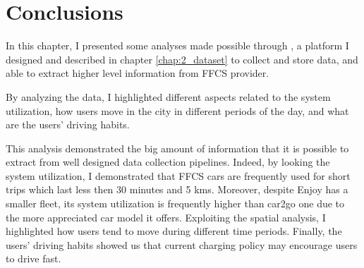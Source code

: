 \section{Conclusions}
\label{sec:3_conclusion}

In this chapter, I presented some analyses made possible through \tool, a platform I designed and described in chapter \ref{chap:2_dataset} to collect and store data, and able to extract higher level information from FFCS provider.

By analyzing the data, I highlighted different aspects related to the system utilization, how users move in the city in different periods of the day, and what are the users' driving habits.

This analysis demonstrated the big amount of information that it is possible to extract from well designed data collection pipelines. Indeed,  by looking the system utilization, I demonstrated that FFCS cars are frequently used for short trips which last less then 30 minutes and 5 kms. Moreover, despite Enjoy has a smaller fleet, its system utilization is frequently higher than car2go one due to the more appreciated car model it offers. Exploiting the spatial analysis, I highlighted how users tend to move during different time periods. Finally, the users' driving habits showed us that current charging policy may encourage users to drive fast. 

